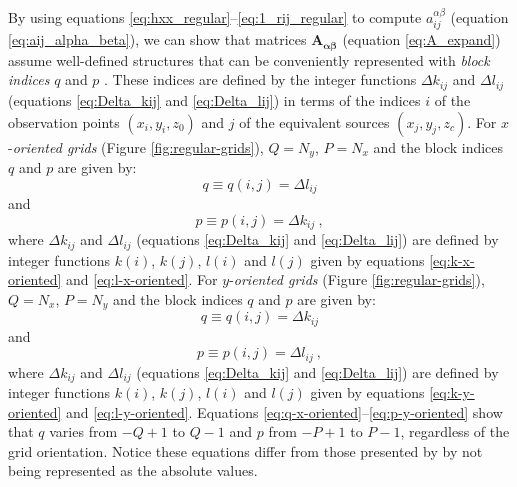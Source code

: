 \documentclass[manuscript,noblind]{geophysics}
\begin{document}
By using equations \ref{eq:hxx_regular}--\ref{eq:1_rij_regular} to compute 
$a^{\alpha\beta}_{ij}$ (equation \ref{eq:aij_alpha_beta}), we can show that 
matrices $\mathbf{A_{\boldsymbol{\alpha\beta}}}$ (equation \ref{eq:A_expand}) assume
well-defined structures that can be conveniently
represented with \textit{block indices} $q$ and $p$ \citep{takahashi2020convolutional}.
These indices are defined by the integer functions $\Delta k_{ij}$ and $\Delta l_{ij}$ 
(equations \ref{eq:Delta_kij} and \ref{eq:Delta_lij}) in terms of the indices $i$ 
of the observation points $(x_{i}, y_{i}, z_{0})$ and $j$ of the equivalent sources
$(x_{j}, y_{j}, z_{c})$.
For $x$-\textit{oriented grids} (Figure \ref{fig:regular-grids}), $Q = N_{y}$, $P = N_{x}$ 
and the block indices $q$ and $p$ are given by:
\begin{equation}
	q \equiv q(i, j) = \Delta l_{ij}
	\label{eq:q-x-oriented}
\end{equation}
and
\begin{equation}
	p \equiv p(i, j) = \Delta k_{ij} \: ,
	\label{eq:p-x-oriented}
\end{equation}
where $\Delta k_{ij}$ and $\Delta l_{ij}$ (equations \ref{eq:Delta_kij} and \ref{eq:Delta_lij}) 
are defined by integer functions $k(i)$, $k(j)$, $l(i)$ and $l(j)$ given by equations 
\ref{eq:k-x-oriented} and \ref{eq:l-x-oriented}.
For $y$-\textit{oriented grids} (Figure \ref{fig:regular-grids}), $Q = N_{x}$, $P = N_{y}$ and 
the block indices $q$ and $p$ are given by:
\begin{equation}
	q \equiv q(i, j) = \Delta k_{ij}
	\label{eq:q-y-oriented}
\end{equation}
and
\begin{equation}
	p \equiv p(i, j) = \Delta l_{ij} \: ,
	\label{eq:p-y-oriented}
\end{equation}
where $\Delta k_{ij}$ and $\Delta l_{ij}$ (equations \ref{eq:Delta_kij} and \ref{eq:Delta_lij}) 
are defined by integer functions $k(i)$, $k(j)$, $l(i)$ and $l(j)$ given by equations 
\ref{eq:k-y-oriented} and \ref{eq:l-y-oriented}.
Equations \ref{eq:q-x-oriented}--\ref{eq:p-y-oriented} show that $q$ varies from $-Q+1$
to $Q-1$ and $p$ from $-P+1$ to $P-1$, regardless of the grid orientation. Notice these equations differ 
from those presented by \citet{takahashi2020convolutional} by not being represented as the absolute values.

\end{document}

